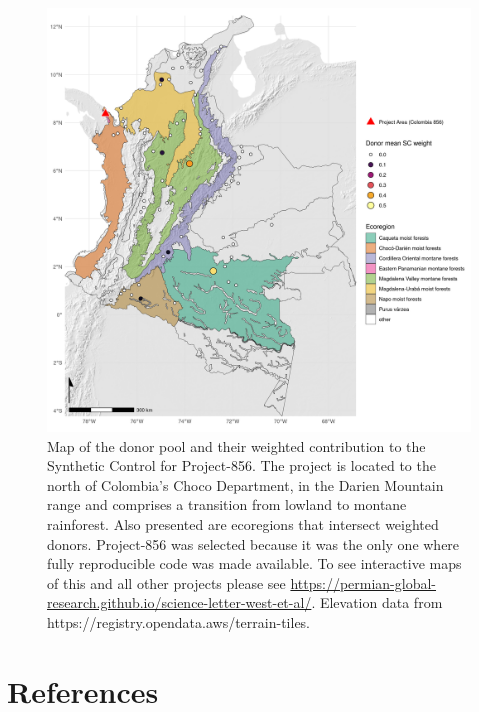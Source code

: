 \documentclass[
  number,
  3p]{elsarticle}
\begin{document}
\begin{figure}

{\centering \includegraphics{figures/colombia_856_donors.png}

}

\caption{\label{fig-map}Map of the donor pool and their weighted
contribution to the Synthetic Control for Project-856. The project is
located to the north of Colombia's Choco Department, in the Darien
Mountain range and comprises a transition from lowland to montane
rainforest. Also presented are ecoregions
\citep{dinerstein_ecoregion-based_2017} that intersect weighted donors.
Project-856 was selected because it was the only one where fully
reproducible code was made available. To see interactive maps of this
and all other projects please see
\url{https://permian-global-research.github.io/science-letter-west-et-al/}.
Elevation data from https://registry.opendata.aws/terrain-tiles.}

\end{figure}

\newpage{}

\hypertarget{references}{%
\section{References}\label{references}}

\renewcommand{\bibsection}{}

\end{document}

